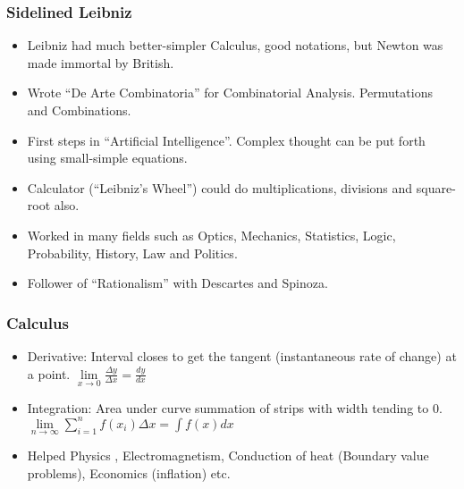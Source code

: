 \begin{frame}[fragile]
\frametitle{Sidelined Leibniz}
\begin{itemize}[label=\textbullet, noitemsep,nolistsep]
\item Leibniz had much better-simpler Calculus, good notations, but Newton was made immortal by British.
\item Wrote ``De Arte Combinatoria'' for Combinatorial Analysis. Permutations and Combinations.
\item First steps in ``Artificial Intelligence''. Complex thought can be put forth using small-simple equations.
\item Calculator (``Leibniz's Wheel'') could do multiplications, divisions and square-root also.
\item Worked in many fields such as Optics, Mechanics, Statistics, Logic, Probability, History, Law and Politics.
\item Follower of ``Rationalism'' with Descartes and Spinoza.
\end{itemize}
\end{frame}

\begin{frame}[fragile]
\frametitle{Calculus}
\begin{itemize}[label=\textbullet,noitemsep,nolistsep]
\item Derivative: Interval closes to get the tangent (instantaneous rate of change) at a point. $\lim \limits_{x \to 0} \frac{\Delta y}{\Delta x} = \frac{dy}{dx}$
\item Integration: Area under curve summation of strips with width tending to 0.
$\lim \limits_{n \to \infty} \sum^n_{i=1} f(x_i)\Delta x = \int f(x) dx$
\item Helped Physics , Electromagnetism, Conduction of heat (Boundary value problems), Economics (inflation) etc.
\end{itemize}
\end{frame}

